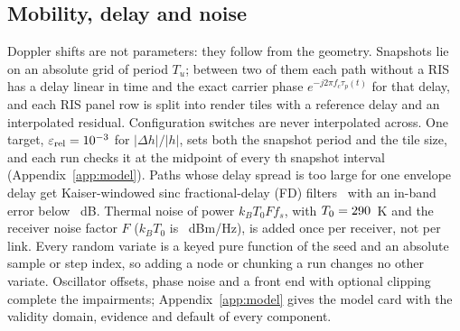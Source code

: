 \subsection{Mobility, delay and noise}\label{sec:model-doppler}\label{sec:model-noise}
Doppler shifts are not parameters: they follow from the geometry. Snapshots
lie on an absolute grid of period $T_u$; between two of them each path without a RIS has a delay
linear in time and the exact carrier phase $e^{-j2\pi f_c\tau_p(t)}$ for that delay, and each
RIS panel row is split into render tiles with a reference delay and an interpolated residual.
Configuration switches are never interpolated across. One target,
$\varepsilon_{\mathrm{rel}}=10^{-3}$ for $|\Delta h|/|h|$, sets both the snapshot period
and the tile size, and each run checks it at the midpoint of every
\numVerifyStride{}th snapshot interval (Appendix~\ref{app:model}). Paths whose delay spread is too large for one envelope
delay get Kaiser-windowed sinc fractional-delay (FD) filters~\cite{Laakso1996FracDelay} with
an in-band error below \numFdTargetDb~dB. Thermal noise of power
$k_BT_0Ff_s$, with $T_0=290$~K and the receiver noise factor $F$ ($k_BT_0$ is
\numThermalDbmHz~dBm/Hz), is added once per receiver, not per link. Every
random variate is a keyed pure function of the seed and an absolute sample or step index, so
adding a node or chunking a run changes no other variate. Oscillator offsets, phase noise and a
front end with optional clipping complete the impairments; Appendix~\ref{app:model} gives the model card
with the validity domain, evidence and default of every component.
